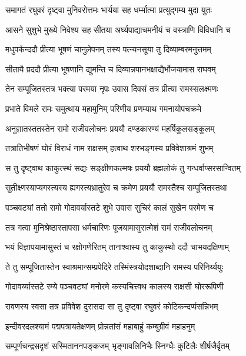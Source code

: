\twolineshloka
{समागतं रघुवरं दृष्ट्वा मुनिवरोत्तमः}
{भार्यया सह धर्म्मात्मा प्रत्युद्गम्य मुदा युतः}%

\twolineshloka
{आसने सुशुभे मुख्ये निवेश्य सह सीतया}
{अर्घ्यपाद्याचमनीयं च वस्त्राणि विविधानि च}%

\twolineshloka
{मधुपर्कन्ददौ प्रीत्या भूषणं चानुलेपनम्}
{तस्य पत्न्यनसूया तु दिव्याम्बरमनुत्तमम्}%

\twolineshloka
{सीतायै प्रददौ प्रीत्या भूषणानि द्युमन्ति च}
{दिव्यान्नपानभक्षाद्यैर्भोजयामास राघवम्}%

\twolineshloka
{तेन सम्पूजितस्तत्र भक्त्या परमया नृपः}
{उवास दिवसं तत्र प्रीत्या रामस्सलक्ष्मणः}%

\twolineshloka
{प्रभाते विमले रामः समुत्थाय महामुनिम्}
{परिणीय प्रणम्याथ गमनायोपचक्रमे}%

\twolineshloka
{अनुज्ञातस्ततस्तेन रामो राजीवलोचनः}
{प्रययौ दण्डकारण्यं महर्षिकुलसङ्कुलम्}%

\twolineshloka
{तत्रातिभीषणं घोरं विराधं नाम राक्षसम्}
{हत्वाथ शरभङ्गस्य प्रविवेशाश्रमं शुभम्}%

\twolineshloka
{स तु दृष्ट्वाथ काकुत्स्थं सद्यः सङ्क्षीणकल्मषः}
{प्रययौ ब्रह्मलोकं तु गन्धर्वाप्सरसान्वितम्}%

\twolineshloka
{सुतीक्ष्णस्याप्यगस्त्यस्य ह्यगस्त्यभ्रातुरेव च}
{क्रमेण प्रययौ रामस्तैश्च सम्पूजितस्तथा}%

\twolineshloka
{पञ्चवट्यां ततो रामो गोदावर्यास्तटे शुभे}
{उवास सुचिरं कालं सुखेन परमेण च}%

\twolineshloka
{तत्र गत्वा मुनिश्रेष्ठास्तापसा धर्मचारिणः}
{पूजयामासुरात्मेशं रामं राजीवलोचनम्}%

\twolineshloka
{भयं विज्ञापयामासुस्तं च रक्षोगणेरितम्}
{तानाश्वास्य तु काकुस्थो ददौ चाभयदक्षिणाम्}%

\twolineshloka
{ते तु सम्पूजितास्तेन स्वाश्रमान्सम्प्रपेदिरे}
{तस्मिंस्त्रयोदशाब्दानि रामस्य परिनिर्य्ययुः}%

\twolineshloka
{गोदावर्य्यास्तटे रम्ये पञ्चवट्यां मनोरमे}
{कस्यचित्त्वथ कालस्य राक्षसी घोररूपिणी}%

\twolineshloka
{रावणस्य स्वसा तत्र प्रविवेश दुरासदा}
{सा तु दृष्ट्वा रघुवरं कोटिकन्दर्प्पसन्निभम्}%

\twolineshloka
{इन्दीवरदलश्यामं पद्मपत्रायतेक्षणम्}
{प्रोन्नतांसं महाबाहुं कम्बुग्रीवं महाहनुम्}%

\twolineshloka
{सम्पूर्णचन्द्रसदृशं सस्मिताननपङ्कजम्}
{भृङ्गावलिनिभैः स्निग्धैः कुटिलैः शीर्षजैर्वृतम्}%


